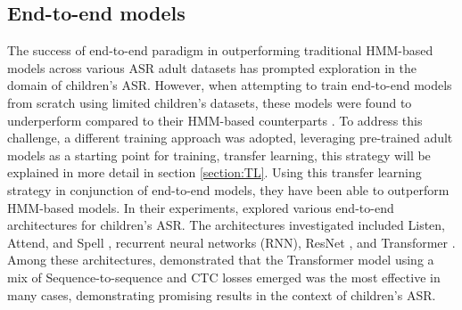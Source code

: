 \subsection{End-to-end models}
The success of end-to-end paradigm in outperforming traditional HMM-based models across various ASR adult datasets has prompted exploration in the domain of children's ASR. However, when attempting to train end-to-end models from scratch using limited children's datasets, these models were found to underperform compared to their HMM-based counterparts \cite{gelin2021endtoend}. To address this challenge, a different training approach was adopted, leveraging pre-trained adult models as a starting point for training, transfer learning, this strategy will be explained in more detail in section \ref{section:TL}. Using this transfer learning strategy in conjunction of end-to-end models, they have been able to outperform HMM-based models. In their experiments, \cite{gelin2021endtoend,sri_end2end,chen2020data,ng2020cuhk} explored various end-to-end architectures for children's ASR. The architectures investigated included Listen, Attend, and Spell \cite{chan2015listen}, recurrent neural networks (RNN), ResNet \cite{targ2016resnet}, and Transformer \cite{Transformer}. Among these architectures, \cite{gelin2021endtoend} demonstrated that the Transformer model using a mix of Sequence-to-sequence and CTC losses emerged was the most effective in many cases, demonstrating promising results in the context of children's ASR.


